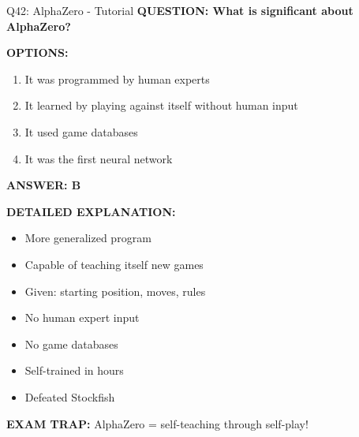 \documentclass[8pt]{beamer}
\begin{document}
	\begin{frame}{Q42: AlphaZero - Tutorial}
		\fontsize{6.5}{7.5}\selectfont
		\textbf{QUESTION: What is significant about AlphaZero?}
		
		\vspace{0.1cm}
		\textbf{OPTIONS:}
		\begin{enumerate}
			\item It was programmed by human experts
			\item It learned by playing against itself without human input
			\item It used game databases
			\item It was the first neural network
		\end{enumerate}
		
		\vspace{0.1cm}
		\textcolor{myblue}{\textbf{ANSWER: B}}
		
		\vspace{0.1cm}
		\textbf{DETAILED EXPLANATION:}
		\begin{itemize}
			\item More generalized program
			\item Capable of teaching itself new games
			\item Given: starting position, moves, rules
			\item No human expert input
			\item No game databases
			\item Self-trained in hours
			\item Defeated Stockfish
		\end{itemize}
		
		\vspace{0.1cm}
		\textcolor{myred}{\textbf{EXAM TRAP:}} AlphaZero = \textcolor{myblue}{self-teaching through self-play}!
	\end{frame}
	
\end{document}
